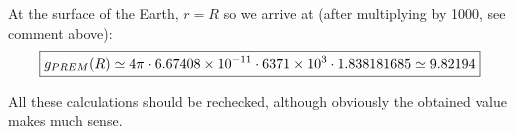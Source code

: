 At the surface of the Earth, $r=R$ so we arrive at (after multiplying by 1000, see comment above): 
\[
\boxed{
g_{\tiny PREM}(R) \simeq 
4 \pi \cdot 6.67408\times 10^{-11}\cdot  6371\times 10^3 \cdot 1.838181685
\simeq 9.82194
}
\]

All these calculations should be rechecked, although obviously the obtained value makes much sense. 

